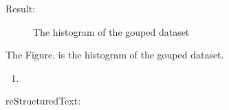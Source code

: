 \documentclass[letterpaper,12pt,english]{sphinxmanual}
\begin{document}
Result:

\begin{figure}[htbp]
\centering
\capstart

\noindent{}
\caption{The histogram of the gouped dataset}\label{\detokenize{rtxt:id14}}\label{\detokenize{rtxt:fig-hist-demo}}\end{figure}

The Figure. {\hyperref[\detokenize{rtxt:fig-hist-demo}]{}} is the histogram of the gouped dataset.
\begin{enumerate}
\def\theenumi{\arabic{enumi}}
\def\labelenumi{\theenumi .}
\makeatletter\def\p@enumii{\p@enumi \theenumi .}\makeatother
\setcounter{enumi}{4}
\item {} 

\end{enumerate}

reStructuredText:
\end{document}
